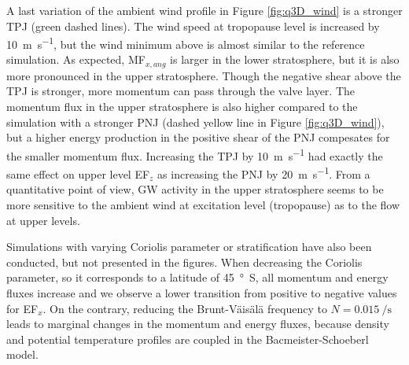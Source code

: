 A last variation of the ambient wind profile in Figure \ref{fig:q3D_wind} is a stronger TPJ (green dashed lines). The wind speed at tropopause level is increased by \SI{10}{\meter\per\second}, but the wind minimum above is almost similar to the reference simulation. As expected, MF$_{x,ang}$ is larger in the lower stratosphere, but it is also more pronounced in the upper stratosphere. Though the negative shear above the TPJ is stronger, more momentum can pass through the valve layer. The momentum flux in the upper stratosphere is also higher compared to the simulation with a stronger PNJ (dashed yellow line in Figure \ref{fig:q3D_wind}), but a higher energy production in the positive shear of the PNJ compesates for the smaller momentum flux. Increasing the TPJ by \SI{10}{\meter\per\second} had exactly the same effect on upper level EF$_z$ as increasing the PNJ by \SI{20}{\meter\per\second}. From a quantitative point of view, GW activity in the upper stratosphere seems to be more sensitive to the ambient wind at excitation level (tropopause) as to the flow at upper levels.

Simulations with varying Coriolis parameter or stratification have also been conducted, but not presented in the figures. When decreasing the Coriolis parameter, so it corresponds to a latitude of \SI{45}{\degree S}, all momentum and energy fluxes increase and we observe a lower transition from positive to negative values for EF$_x$. On the contrary, reducing the Brunt-Väisälä frequency to $N=\SI{0.015}{\per\second}$ leads to marginal changes in the momentum and energy fluxes, because density and potential temperature profiles are coupled in the Bacmeister-Schoeberl model.





